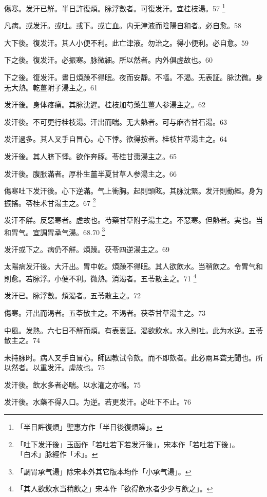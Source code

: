 \documentclass[12pt,twoside,UTF8,b5paper]{ctexbook}
\begin{document}
傷寒。发汗已觧。半日許復煩。脉浮數者。可復发汗。宜桂枝湯。57
	\footnote{「半日許復煩」聖惠方作「半日後復煩躁」。}

凡病。或发汗。或吐。或下。或亡血。{内}无津液而陰陽自和者。必自愈。58

大下後。復发汗。其人小便不利。此亡津液。勿治之。得小便利。必自愈。59

下之後。復发汗。必振寒。脉微細。所以然者。内外俱虗故也。60

下之後。復发汗。晝日煩躁不得眠。夜而安靜。不嘔。不渴。无表証。脉沈微。身无大熱。乾薑附子湯主之。61

发汗後。身体疼痛。其脉沈遲。桂枝加芍藥生薑人参湯主之。62

发汗後。{不可更行桂枝湯。}汗出而喘。无大熱者。可与麻杏甘石湯。63

发汗過多。其人叉手自冒心。心下悸。欲得按者。桂枝甘草湯主之。64

发汗後。其人脐下悸。欲作奔豚。苓桂甘棗湯主之。65

发汗後。腹胀滿者。厚朴{生薑半夏甘草人参}湯主之。66

傷寒吐下发汗後。心下逆滿。气上衝胸。起則頭眩。其脉沈緊。发汗則動經。身为振搖。苓桂术甘湯主之。67
	\footnote{「吐下发汗後」玉函作「若吐若下若发汗後」，宋本作「若吐若下後」。\\「白术」脉經作「术」。}

发汗不觧。反惡寒者。虗故也。芍藥甘草附子湯主之。不惡寒。但熱者。実也。当和胃气。宜調胃承气湯。68.70
	\footnote{「調胃承气湯」除宋本外其它版本均作「小承气湯」。}

发汗或下之。{病仍}不觧。煩躁。茯苓四逆湯主之。69

太陽病发汗後。大汗出。胃中乾。煩躁不得眠。其人欲飲水。当稍飲之。令胃气和則愈。若脉浮。小便不利。微熱。消渴者。五苓散主之。71
	\footnote{「其人欲飲水当稍飲之」宋本作「欲得飲水者少少与飲之」。}

发汗已。脉浮數。煩渴者。五苓散主之。72

傷寒。汗出而渴者。五苓散主之。不渴者。茯苓甘草湯主之。73

中風。发熱。六七日不觧而煩。有表裏証。渴欲飲水。水入則吐。此为水逆。五苓散主之。74

未持脉时。病人叉手自冒心。師因教试令欬。而不即欬者。此必兩耳聋无聞也。所以然者。以重发汗。虗故也。75

发汗後。飲水多者必喘。以水灌之亦喘。75

发汗後。水藥不得入口。为逆。{若更发汗。必吐下不止。}76
\end{document}
